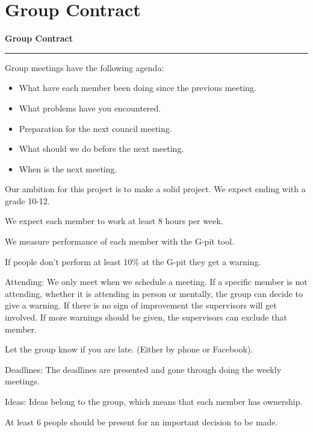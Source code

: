 \section{Group Contract}
\label{app:groupContract}
\begin{center}
{\Large \bfseries Group Contract }
\rule{\textwidth}{0.5mm}
\end{center}

Group meetings have the following agenda:
\begin{itemize}
 \item What have each member been doing since the previous meeting.
 \item What problems have you encountered.
 \item Preparation for the next council meeting.
 \item What should we do before the next meeting.
 \item When is the next meeting.
\end{itemize}

Our ambition for this project is to make a solid project.
We expect ending with a grade 10-12.

We expect each member to work at least 8 hours per week.

We measure performance of each member with the G-pit tool.

If people don't perform at least 10\% at the G-pit they get a warning.

Attending: We only meet when we schedule a meeting. 
If a specific member is not attending, whether it is attending in person or mentally, the group can decide to give a warning.
If there is no sign of improvement the supervisors will get involved. If more warnings should be given, the supervisors can exclude that member.

Let the group know if you are late. (Either by phone or Facebook).

Deadlines: The deadlines are presented and gone through doing the weekly meetings.

Ideas: Ideas belong to the group, which means that each member has ownership.

At least 6 people should be present for an important decision to be made.